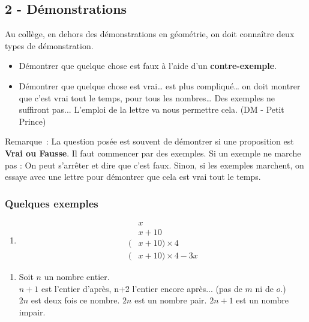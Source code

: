 \documentclass[11pt]{article}
\begin{document}
\subsection*{2 - Démonstrations}

Au collège, en dehors des démonstrations en géométrie, on doit connaître deux types de démonstration.

\begin{itemize}
  \item Démontrer que quelque chose est faux à l’aide d’un \textbf{contre-exemple}.
  \item Démontrer que quelque chose est vrai… est plus compliqué… on doit montrer que c’est vrai tout le temps, pour tous les nombres… Des exemples ne suffiront pas$...$ L’emploi de la lettre va nous permettre cela. (DM - Petit Prince)
\end{itemize} 

Remarque : La question posée est souvent de démontrer si une proposition est \textbf{Vrai ou Fausse}. Il faut commencer par des exemples. Si un exemple ne marche pas : On peut s'arrêter et dire que c'est faux. Sinon, si les exemples marchent, on essaye avec une lettre pour démontrer que cela est vrai tout le temps.

\subsubsection*{Quelques exemples}
\begin{multicols}{2}
\begin{enumerate}
\item[1.]


\begin{align*}
&x \\
&x + 10 \\
(&x + 10) \times 4 \\
(&x + 10) \times 4 - 3x
\end{align*}
\end{enumerate}
\end{multicols}
\begin{enumerate}
\item[2.]
Soit $n$ un nombre entier. \\
$n+1$ est l'entier d'après, n+2 l'entier encore après... (pas de $m$ ni de $o$.)\\
$2n$ est deux fois ce nombre. $2n$ est un nombre pair. $2n+1$ est un nombre impair.
\end{enumerate}
\end{document}
